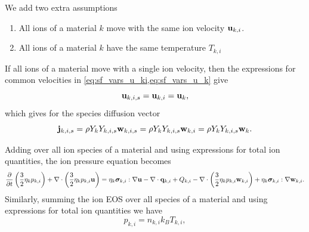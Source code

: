 \documentclass[a4paper,11pt]{report}
\begin{document}
We add two extra assumptions
\begin{enumerate}
    \item All ions of a material $k$ move with the same ion velocity $\mathbf{u}_{k,i}$. \label{eq:single_ion_vel}
    \item All ions of a material $k$ have the same temperature $T_{k,i}$ \label{eq:single_ion_T}
\end{enumerate}

If all ions of a material move with a single ion velocity, then the expressions for common velocities in \cref{eq:sf_vars_u_ki,eq:sf_vars_u_k} give 
\begin{equation}
    \mathbf{u}_{k,i,s} = \mathbf{u}_{k,i} = \mathbf{u}_k,
\end{equation} 
which gives for the species diffusion vector
\begin{equation}
    \label{sec:sf_mm_ms_diffusion}
    \mathbf{j}_{k,i,s} = \rho Y_k Y_{k,i,s} \mathbf{w}_{k,i,s} = \rho Y_k Y_{k,i,s} \mathbf{w}_{k,i} = \rho Y_k Y_{k,i,s} \mathbf{w}_k.
\end{equation} 

Adding over all ion species of a material and using expressions for total ion quantities, the ion pressure equation becomes
\begin{equation*}
    \frac{\partial}{\partial t} \left( \frac{3}{2} \eta_k p_{k,i} \right) + \nabla \cdot \left( \frac{3}{2} \eta_k p_{k,i} \mathbf{u} \right) = \\ 
    \eta_k \bm \sigma_{k,i} : \nabla \mathbf{u} - \nabla \cdot \mathbf{q}_{k,i} + Q_{k,i} - \nabla \cdot \left( \frac{3}{2} \eta_k p_{k,i} \mathbf{w}_{k,i} \right) + \eta_k \bm \sigma_{k,i} : \nabla \mathbf{w}_{k,i}.
\end{equation*}
Similarly, summing the ion EOS over all species of a material and using expressions for total ion quantities we have
\begin{equation*}
    p_{k,i} = n_{k,i} k_B T_{k,i},
\end{equation*}
\end{document}
